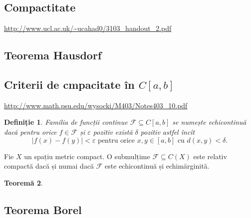 \documentclass[a4paper,12pt]{article}
\theoremstyle{change}
\newtheorem{theorem}{Teoremă}[section]
\newtheorem{definition}[theorem]{Definiție}
\begin{document}

\subsection{Compactitate}

\url{http://www.ucl.ac.uk/~ucahad0/3103_handout_2.pdf}

\subsection{Teorema Hausdorf}


\subsection{Criterii de cmpacitate în $C[a,b]$}

\url{http://www.math.psu.edu/wysocki/M403/Notes403_10.pdf}

\begin{definition}
Familia de funcții continue $\mathcal{F}\subseteq C[a,b]$ se numește \emph{echicontinuă} dacă pentru orice $f\in \mathcal{F}$ și  $\varepsilon$ pozitiv există $\delta$ pozitiv astfel încît
\[
|f(x)-f(y)|<\varepsilon\text{ pentru orice }x,y\in[a,b]\text{ cu }d(x,y)<\delta. 
\]
\end{definition}
Fie $X$ un spațiu metric compact. O submulțime $\mathcal{F}\subseteq C(X)$ este relativ compactă dacă și numai dacă $\mathcal{F}$ este echicontinuă și echimărginită.
\begin{theorem}

\end{theorem}

\subsection{Teorema Borel}
\end{document}
